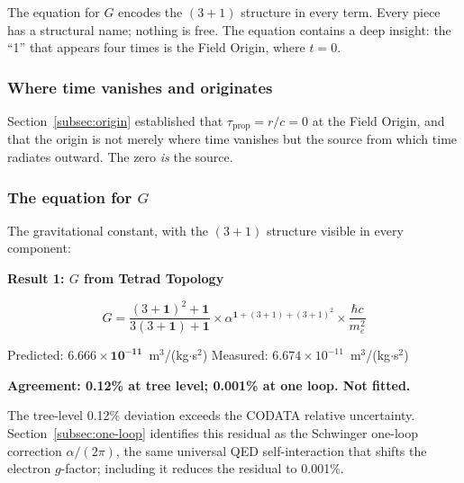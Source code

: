 \documentclass[aps,prd,preprint,superscriptaddress,showpacs,preprintnumbers,amsmath,amssymb,nofootinbib]{revtex4-2}
\begin{document}
The equation for $G$ encodes the $(3{+}1)$ structure in every term. Every piece has a structural name; nothing is free. The equation contains a deep insight: the ``1'' that appears four times is the Field Origin, where $t = 0$.

\subsubsection*{Where time vanishes and originates}

Section~\ref{subsec:origin} established that $\tau_{\text{prop}} = r/c = 0$ at the Field Origin, and that the origin is not merely where time vanishes but the source from which time radiates outward. The zero \emph{is} the source.

\subsubsection*{The equation for $G$}

The gravitational constant, with the $(3{+}1)$ structure visible in every component:

\vspace{1.5em}
\noindent
\colorbox{resultgreen}{\parbox{\dimexpr\textwidth-2\fboxsep\relax}{%
\vspace{0.8em}
\centering
\textbf{\large Result 1: $G$ from Tetrad Topology}

\vspace{0.5em}
\boldmath
\begin{equation}
G = \frac{(3+\mathbf{1})^2 + \mathbf{1}}{3(3+\mathbf{1}) + \mathbf{1}} \times \alpha^{\mathbf{1}+(3+1)+(3+1)^2} \times \frac{\hbar c}{m_e^2}
\label{eq:master}
\end{equation}
\unboldmath

\vspace{0.3em}
Predicted: $\bm{6.666 \times 10^{-11}}$~m$^3$/(kg$\cdot$s$^2$) \quad Measured: $6.674 \times 10^{-11}$~m$^3$/(kg$\cdot$s$^2$)

\textbf{Agreement: 0.12\% at tree level; 0.001\% at one loop. Not fitted.}
\vspace{0.5em}
}}
\vspace{1cm}

The tree-level 0.12\% deviation exceeds the CODATA relative uncertainty. Section~\ref{subsec:one-loop} identifies this residual as the Schwinger one-loop correction $\alpha/(2\pi)$, the same universal QED self-interaction that shifts the electron $g$-factor; including it reduces the residual to 0.001\%.
\end{document}
